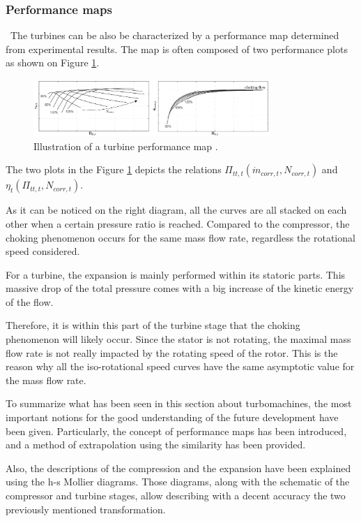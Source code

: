 \subsubsection{Performance maps}
\quad\ The turbines can be also be characterized by a performance map determined from experimental results. The map is often composed of two performance plots as shown on Figure \ref{fig:C4_turbmap}.

\begin{figure}[h]
    \centering
    \includegraphics[width=0.8\textwidth]{Turb_Map.png}
    \caption{Illustration of a turbine performance map \cite{Dixon2013}.}
    \label{fig:C4_turbmap}
\end{figure}

The two plots in the Figure \ref{fig:C4_turbmap} depicts the relations \(\Pi_{tt,t}(\dot{m}_{corr,t},N_{corr,t})\) and \(\eta_t(\Pi_{tt,t},N_{corr,t})\). 

As it can be noticed on the right diagram, all the curves are all stacked on each other when a certain pressure ratio is reached. Compared to the compressor, the choking phenomenon occurs for the same mass flow rate, regardless the rotational speed considered. 

For a turbine, the expansion is mainly performed within its statoric parts. This massive drop of the total pressure comes with a big increase of the kinetic energy of the flow. 

Therefore, it is within this part of the turbine stage that the choking phenomenon will likely occur. Since the stator is not rotating, the maximal mass flow rate is not really impacted by the rotating speed of the rotor. This is the reason why all the iso-rotational speed curves have the same asymptotic value for the mass flow rate.

To summarize what has been seen in this section about turbomachines, the most important notions for the good understanding of the future development have been given. Particularly, the concept of performance maps has been introduced, and a method of extrapolation using the similarity has been provided.

Also, the descriptions of the compression and the expansion have been explained using the h-s Mollier diagrams. Those diagrams, along with the schematic of the compressor and turbine stages, allow describing with a decent accuracy the two previously mentioned transformation.

